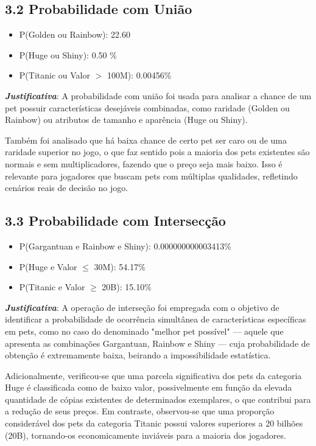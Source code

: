 \documentclass[12pt]{article}
\begin{document}
\subsection*{3.2 Probabilidade com União}
\begin{itemize}
    \item P(Golden ou Rainbow): 22.60%
    \item P(Huge ou Shiny): 0.50 \%
    \item P(Titanic ou Valor $>$ 100M): 0.00456\%
\end{itemize}
\textbf{\textit{Justificativa}}: A probabilidade com união foi usada para analisar a chance de um pet possuir características desejáveis combinadas, como raridade (Golden ou Rainbow) ou atributos de tamanho e aparência (Huge ou Shiny).

Também foi analisado que há baixa chance de certo pet ser caro ou de uma raridade superior no jogo, o que faz sentido pois a maioria dos pets existentes são normais e sem multiplicadores, fazendo que o preço seja mais baixo. Isso é relevante para jogadores que buscam pets com múltiplas qualidades, refletindo cenários reais de decisão no jogo.

\subsection*{3.3 Probabilidade com Intersecção}
\begin{itemize}
    \item P(Gargantuan e Rainbow e Shiny): 0.000000000003413\%
    \item P(Huge e Valor $\leq$ 30M): 54.17\%
    \item P(Titanic e Valor $\geq$ 20B): 15.10\%
\end{itemize}
\textbf{\textit{Justificativa}}: A operação de interseção foi empregada com o objetivo de identificar a probabilidade de ocorrência simultânea de características específicas em pets, como no caso do denominado "melhor pet possível" — aquele que apresenta as combinações Gargantuan, Rainbow e Shiny — cuja probabilidade de obtenção é extremamente baixa, beirando a impossibilidade estatística.

Adicionalmente, verificou-se que uma parcela significativa dos pets da categoria Huge é classificada como de baixo valor, possivelmente em função da elevada quantidade de cópias existentes de determinados exemplares, o que contribui para a redução de seus preços.
Em contraste, observou-se que uma proporção considerável dos pets da categoria Titanic possui valores superiores a 20 bilhões (20B), tornando-os economicamente inviáveis para a maioria dos jogadores.
\end{document}
